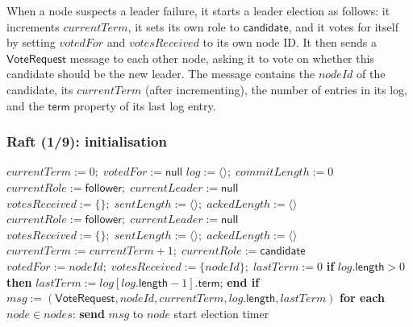 When a node suspects a leader failure, it starts a leader election as follows: it increments $\mathit{currentTerm}$, it sets its own role to $\mathsf{candidate}$, and it votes for itself by setting $\mathit{votedFor}$ and $\mathit{votesReceived}$ to its own node ID.
It then sends a $\mathsf{VoteRequest}$ message to each other node, asking it to vote on whether this candidate should be the new leader.
The message contains the $\mathit{nodeId}$ of the candidate, its $\mathit{currentTerm}$ (after incrementing), the number of entries in its log, and the $\mathsf{term}$ property of its last log entry.

\begin{frame}
    \label{s:raft1}
    \frametitle{Raft (1/9): initialisation}
    \footnotesize
    \begin{algorithmic}
            \State $\mathit{currentTerm} := 0;\; \mathit{votedFor} := \mathsf{null}$
            \State $\mathit{log} := \langle\rangle;\; \mathit{commitLength} := 0$
            \State $\mathit{currentRole} := \mathsf{follower};\; \mathit{currentLeader} := \mathsf{null}$
            \State $\mathit{votesReceived} := \{\};\; \mathit{sentLength} := \langle\rangle;\; \mathit{ackedLength} := \langle\rangle$
        \EndOn
        \State
            \State $\mathit{currentRole} := \mathsf{follower};\; \mathit{currentLeader} := \mathsf{null}$
            \State $\mathit{votesReceived} := \{\};\; \mathit{sentLength} := \langle\rangle;\; \mathit{ackedLength} := \langle\rangle$
        \EndOn
        \State
            \State $\mathit{currentTerm} := \mathit{currentTerm} + 1;\; \mathit{currentRole} := \mathsf{candidate}$
            \State $\mathit{votedFor} := \mathit{nodeId};\; \mathit{votesReceived} := \{\mathit{nodeId}\};\; \mathit{lastTerm} := 0$
            \State \textbf{if} $\mathit{log}.\mathsf{length} > 0$ \textbf{then} $\mathit{lastTerm} := \mathit{log}[\mathit{log}.\mathsf{length} - 1].\mathsf{term}$; \textbf{end if}
            \State $\mathit{msg} := (\mathsf{VoteRequest}, \mathit{nodeId}, \mathit{currentTerm}, \mathit{log}.\mathsf{length}, \mathit{lastTerm})$
            \State \textbf{for each} $\mathit{node} \in \mathit{nodes}$: \textbf{send} $\mathit{msg}$ to $\mathit{node}$
            \State start election timer
        \EndOn
    \end{algorithmic}
\end{frame}

